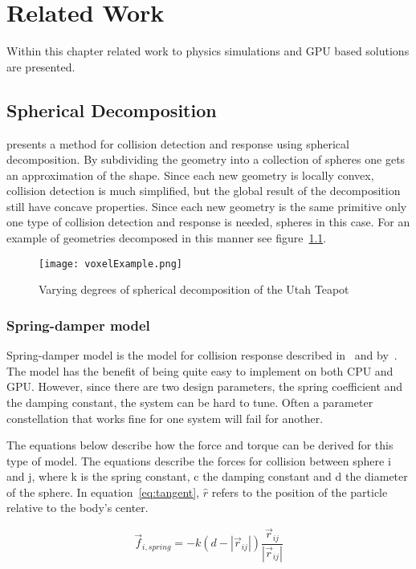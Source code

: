 \chapter{Related Work}\label{cha:related}
Within this chapter related work to physics simulations and GPU based solutions are
presented.
\section{Spherical Decomposition}\label{sec:decomp}
\cite{gpugems} presents a method for collision detection and response using spherical
decomposition. By subdividing the geometry into a collection of spheres one gets an
approximation of the shape. Since each new geometry is locally convex, collision
detection is much simplified, but the global result of the decomposition still have
concave properties. Since each new geometry is the same primitive only
one type of collision detection and response is needed, spheres in this case.
For an example of geometries
decomposed in this manner see figure~\ref{fig:bunnies}.

\begin{figure}[H]
  \centering
  \texttt{[image: voxelExample.png]}
  \caption{Varying degrees of spherical decomposition of the Utah Teapot}
  \label{fig:bunnies}
\end{figure}

\subsection{Spring-damper model}
Spring-damper model is the model for collision response described in~\cite{gpugems} and by~\cite{fossum}.
The model has the benefit of being quite easy to implement on both CPU and GPU.
However, since there are two design parameters, the spring coefficient and the damping
constant, the system can be hard to tune. Often a parameter constellation that works
fine for one system will fail for another.

The equations below describe how the force and torque can be derived for this type
of model. The equations describe the forces for collision between sphere i and j,
where k is the spring constant, c the damping constant and d the
diameter of the sphere. In equation~\ref{eq:tangent}, $\hat{r}$ refers to the
position of the particle relative to the body's center.

\begin{equation}
  \vec{f}_{i,spring} = -k(d-|\vec{r}_{ij}|)\frac{\vec{r}_{ij}}{|\vec{r}_{ij}|}
\end{equation}

